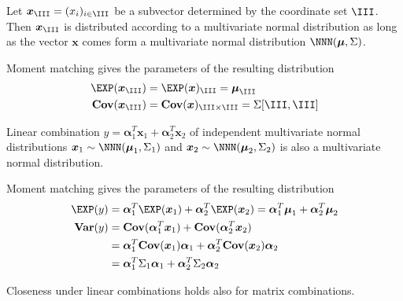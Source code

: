 \documentclass[landscape,footrule]{foils}
\renewcommand{\vec}[1]{\boldsymbol{#1}}
\renewcommand{\VAR}{\mathbf{Var}}
\newcommand{\COV}{\mathbf{Cov}}
\begin{document}


Let $\vec{x}_{\III}=(x_i)_{i\in\III}$ be a subvector determined by the coordinate set $\III$.
Then $\vec{x}_{\III}$ is distributed according to a multivariate normal distribution as long as 
the vector $\vec{x}$ comes form a multivariate normal distribution $\NNN(\vec{\mu},\Sigma)$.

\begin{triangles}
\item Moment matching gives the parameters of the resulting distribution 
\begin{align*}
\EXP(\vec{x}_{\III})&= \EXP(\vec{x})_{\III}=\vec{\mu}_{\III} \\
\COV(\vec{x}_{\III})&=\COV(\vec{x})_{\III\times \III}=\Sigma[\III, \III]
\end{align*}
\end{triangles}


Linear combination $y=\vec{\alpha}_1^T \vec{x}_1+\vec{\alpha}_2^T\vec{x}_2$ of independent multivariate normal distributions $\vec{x}_1\sim\NNN(\vec{\mu}_1,\Sigma_1)$ and $\vec{x}_2\sim\NNN(\vec{\mu}_2,\Sigma_2)$ is also  a multivariate normal distribution.

\begin{triangles}
\item Moment matching gives the parameters of the resulting distribution 
\begin{align*}
\EXP(y)&= \vec{\alpha}_1^T\EXP(\vec{x}_1)+\vec{\alpha}_2^T\EXP(\vec{x}_2)=
\vec{\alpha}_1^T\vec{\mu}_1+\vec{\alpha}_2^T\vec{\mu}_2\\
\VAR(y)&=\COV(\vec{\alpha}_1^T \vec{x}_1) + \COV(\vec{\alpha}_2^T \vec{x}_2)\\
&=\vec{\alpha}_1^T \COV(\vec{x}_1)\vec{\alpha}_1+ \vec{\alpha}_2^T \COV(\vec{x}_2)\vec{\alpha}_2\\
&=\vec{\alpha}_1^T \Sigma_1\vec{\alpha}_1+ \vec{\alpha}_2^T \Sigma_2\vec{\alpha}_2
\end{align*}
\item Closeness under linear combinations holds also for matrix combinations. 
\end{triangles}

\end{document}
